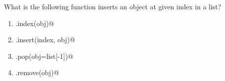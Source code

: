\question
What is the following function inserts an object at given index in a list?

\begin{enumerate}
\item \lstinline@list.index(obj)@
\item \lstinline@list.insert(index, obj)@
\item \lstinline@list.pop(obj=list[-1])@
\item \lstinline@list.remove(obj)@
\end{enumerate}

